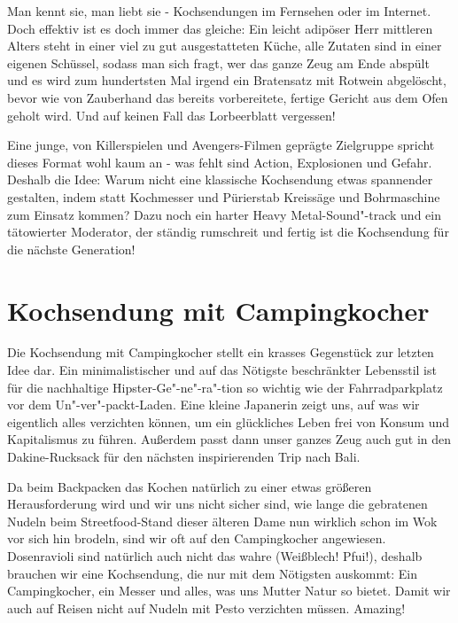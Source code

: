 \documentclass[a5paper,pagesize,10pt,bibtotoc,pointlessnumbers,normalheadings,DIV=9,twoside=false]{scrbook}
\begin{document}
Man kennt sie, man liebt sie - Kochsendungen im Fernsehen oder im Internet.
Doch effektiv ist es doch immer das gleiche:
Ein leicht adipöser Herr mittleren Alters steht in einer viel zu gut ausgestatteten Küche, alle Zutaten sind in einer eigenen Schüssel, sodass man sich fragt, wer das ganze Zeug am Ende abspült und es wird zum hundertsten Mal irgend ein Bratensatz mit Rotwein abgelöscht, bevor wie von Zauberhand das bereits vorbereitete, fertige Gericht aus dem Ofen geholt wird.
Und auf keinen Fall das Lorbeerblatt vergessen!

Eine junge, von Killerspielen und Avengers-Filmen geprägte Zielgruppe spricht dieses Format wohl kaum an - was fehlt sind Action, Explosionen und Gefahr.
Deshalb die Idee: Warum nicht eine klassische Kochsendung etwas spannender gestalten, indem statt Kochmesser und Pürierstab Kreissäge und Bohrmaschine zum Einsatz kommen?
Dazu noch ein harter Heavy Metal-Sound"-track und ein tätowierter Moderator, der ständig rumschreit und fertig ist die Kochsendung für die nächste Generation!

\chapter{Kochsendung mit Campingkocher}

Die Kochsendung mit Campingkocher stellt ein krasses Gegenstück zur letzten Idee dar.
Ein minimalistischer und auf das Nötigste beschränkter Lebensstil ist für die nachhaltige Hipster-Ge"-ne"-ra"-tion so wichtig wie der Fahrradparkplatz vor dem Un"-ver"-packt-Laden.
Eine kleine Japanerin zeigt uns, auf was wir eigentlich alles verzichten können, um ein glückliches Leben frei von Konsum und Kapitalismus zu führen.
Außerdem passt dann unser ganzes Zeug auch gut in den Dakine-Rucksack für den nächsten inspirierenden Trip nach Bali.

Da beim Backpacken das Kochen natürlich zu einer etwas größeren Herausforderung wird und wir uns nicht sicher sind, wie lange die gebratenen Nudeln beim Streetfood-Stand dieser älteren Dame nun wirklich schon im Wok vor sich hin brodeln, sind wir oft auf den Campingkocher angewiesen.
Dosenravioli sind natürlich auch nicht das wahre (Weißblech! Pfui!), deshalb brauchen wir eine Kochsendung, die nur mit dem Nötigsten auskommt:
Ein Campingkocher, ein Messer und alles, was uns Mutter Natur so bietet.
Damit wir auch auf Reisen nicht auf Nudeln mit Pesto verzichten müssen.
Amazing!
\end{document}
